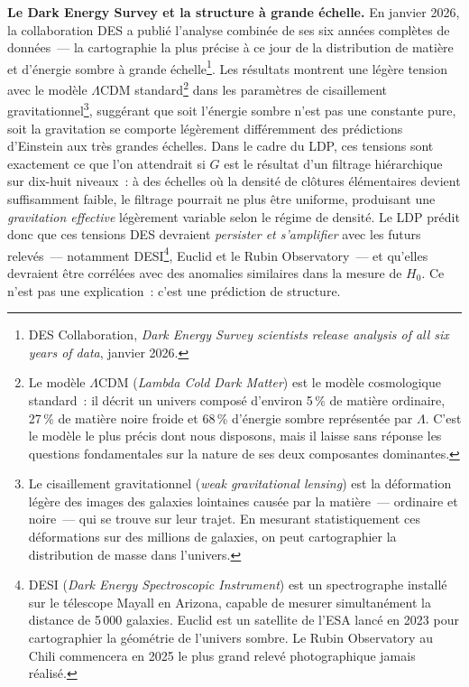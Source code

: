\documentclass[12pt, a4paper, openright]{book}
\begin{document}
\medskip

\textbf{Le Dark Energy Survey et la structure à grande échelle.} En janvier 2026, la collaboration DES a publié l'analyse combinée de ses six années complètes de données~--- la cartographie la plus précise à ce jour de la distribution de matière et d'énergie sombre à grande échelle\footnote{DES Collaboration, \textit{Dark Energy Survey scientists release analysis of all six years of data}, janvier 2026.}. Les résultats montrent une légère tension avec le modèle $\Lambda$CDM standard\footnote{Le modèle $\Lambda$CDM (\textit{Lambda Cold Dark Matter}) est le modèle cosmologique standard~: il décrit un univers composé d'environ 5\,\% de matière ordinaire, 27\,\% de matière noire froide et 68\,\% d'énergie sombre représentée par $\Lambda$. C'est le modèle le plus précis dont nous disposons, mais il laisse sans réponse les questions fondamentales sur la nature de ses deux composantes dominantes.} dans les paramètres de cisaillement gravitationnel\footnote{Le cisaillement gravitationnel (\textit{weak gravitational lensing}) est la déformation légère des images des galaxies lointaines causée par la matière~--- ordinaire et noire~--- qui se trouve sur leur trajet. En mesurant statistiquement ces déformations sur des millions de galaxies, on peut cartographier la distribution de masse dans l'univers.}, suggérant que soit l'énergie sombre n'est pas une constante pure, soit la gravitation se comporte légèrement différemment des prédictions d'Einstein aux très grandes échelles. Dans le cadre du LDP, ces tensions sont exactement ce que l'on attendrait si $G$ est le résultat d'un filtrage hiérarchique sur dix-huit niveaux~: à des échelles où la densité de clôtures élémentaires devient suffisamment faible, le filtrage pourrait ne plus être uniforme, produisant une \emph{gravitation effective} légèrement variable selon le régime de densité. Le LDP prédit donc que ces tensions DES devraient \emph{persister et s'amplifier} avec les futurs relevés~--- notamment DESI\footnote{DESI (\textit{Dark Energy Spectroscopic Instrument}) est un spectrographe installé sur le télescope Mayall en Arizona, capable de mesurer simultanément la distance de 5\,000 galaxies. Euclid est un satellite de l'ESA lancé en 2023 pour cartographier la géométrie de l'univers sombre. Le Rubin Observatory au Chili commencera en 2025 le plus grand relevé photographique jamais réalisé.}, Euclid et le Rubin Observatory~--- et qu'elles devraient être corrélées avec des anomalies similaires dans la mesure de $H_0$. Ce n'est pas une explication~: c'est une prédiction de structure.
\end{document}
